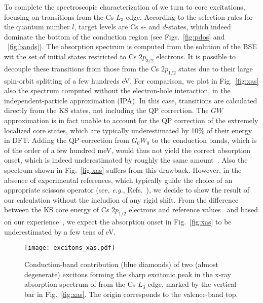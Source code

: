 \documentclass[aps,pra,superscriptaddress,twocolumn]{revtex4}
\begin{document}
To complete the spectroscopic characterization of  we turn to core excitations, focusing on transitions from the Cs $L_3$ edge. 
According to the selection rules for the quantum number $l$, target levels are Cs $s$- and $d$-states, which indeed dominate the bottom of the conduction region (see Figs.~\ref{fig:pdos} and ~\ref{fig:bands}).
The absorption spectrum is computed from the solution of the BSE  wit the set of initial states restricted to Cs $2p_{3/2}$ electrons.
It is possible to decouple these transitions from those from the Cs $2p_{1/2}$ states due to their large spin-orbit splitting of a few hundreds eV.
For comparison, we plot in Fig.~\ref{fig:xas} also the spectrum computed without the electron-hole interaction, in the independent-particle approximation (IPA).
In this case, transitions are calculated directly from the KS states, not including the QP correction.
The $GW$ approximation is in fact unable to account for the QP correction of the extremely localized core states, which are typically underestimated by 10$\%$ of their energy in DFT.
Adding the QP correction from $G_0W_0$ to the conduction bands, which is of the order of a few hundred meV, would thus not yield the correct absorption onset, which is indeed underestimated by roughly the same amount~\cite{vorw+17prb}. 
Also the spectrum shown in Fig.~\ref{fig:xas} suffers from this drawback. 
However, in the absence of experimental references, which typically guide the choice of an appropriate scissors operator (see, \textit{e.g.}, Refs.~\cite{cocc-drax15prb,cocc+16prb,vorw+18jpcl}), we decide to show the result of our calculation without the includion of any rigid shift.
From the difference between the KS core energy of Cs $2p_{1/2}$ electrons and reference values~\cite{bear-burr67rmp} and based on our experience~\cite{cocc-drax15prb,cocc+16prb,vorw+18jpcl}, we expect the absorption onset in Fig.~\ref{fig:xas} to be underestimated by a few tens of eV.

%
\begin{figure}
\center
\texttt{[image: excitons\_xas.pdf]}
\caption{Conduction-band contribution (blue diamonds) of two (almost degenerate) excitons forming the sharp excitonic peak in the x-ray absorption spectrum of  from the Cs $L_3$-edge, marked by the vertical bar in Fig.~\ref{fig:xas}. The origin corresponds to the valence-band top.}
\label{fig:excitons-xas}
\end{figure} 
%
\end{document}
